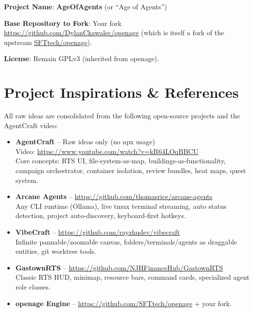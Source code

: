 \documentclass[11pt,a4paper]{article}
\begin{document}
\textbf{Project Name}: \textbf{AgeOfAgents} (or ``Age of Agents'')

\textbf{Base Repository to Fork}: Your fork \href{https://github.com/DylanCkawalec/openage}{https://github.com/DylanCkawalec/openage} (which is itself a fork of the upstream \href{https://github.com/SFTtech/openage}{SFTtech/openage}).

\textbf{License}: Remain GPLv3 (inherited from openage).

\newpage
\section{Project Inspirations \& References}

All raw ideas are consolidated from the following open-source projects and the AgentCraft video:

\begin{itemize}
    \item \textbf{AgentCraft} – Raw ideas only (no npx usage) \\
      Video: \href{https://www.youtube.com/watch?v=kR64LOqBBCU}{https://www.youtube.com/watch?v=kR64LOqBBCU} \\
      Core concepts: RTS UI, file-system-as-map, buildings-as-functionality, campaign orchestrator, container isolation, review bundles, heat maps, quest system.
    \item \textbf{Arcane Agents} – \href{https://github.com/thomasrice/arcane-agents}{https://github.com/thomasrice/arcane-agents} \\
      Any CLI runtime (Ollama), live tmux terminal streaming, auto status detection, project auto-discovery, keyboard-first hotkeys.
    \item \textbf{VibeCraft} – \href{https://github.com/rayzhudev/vibecraft}{https://github.com/rayzhudev/vibecraft} \\
      Infinite pannable/zoomable canvas, folders/terminals/agents as draggable entities, git worktree tools.
    \item \textbf{GastownRTS} – \href{https://github.com/NJHFinanceHub/GastownRTS}{https://github.com/NJHFinanceHub/GastownRTS} \\
      Classic RTS HUD, minimap, resource bars, command cards, specialized agent role classes.
    \item \textbf{openage Engine} – \href{https://github.com/SFTtech/openage}{https://github.com/SFTtech/openage} + your fork.
\end{itemize}
\end{document}
